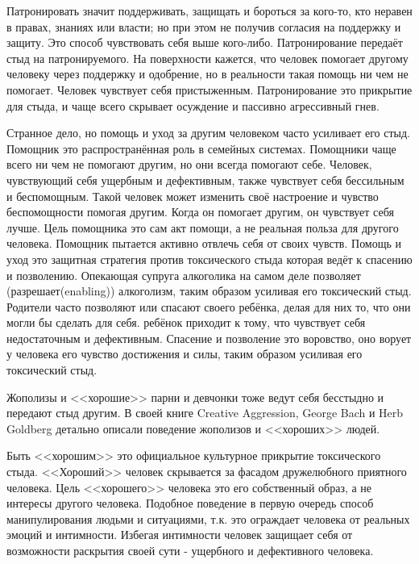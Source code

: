 \documentclass[10pt, fleqn]{article}
\begin{document}

Патронировать значит поддерживать, защищать и бороться за кого-то, кто неравен в правах, знаниях или власти; но при этом не получив согласия на поддержку и защиту. Это способ чувствовать себя выше кого-либо. Патронирование передаёт стыд на патронируемого. На поверхности кажется, что человек помогает другому человеку через поддержку и одобрение, но в реальности такая помощь ни чем не помогает. Человек чувствует себя пристыженным. Патронирование это прикрытие для стыда, и чаще всего скрывает осуждение и пассивно агрессивный гнев.



Странное дело, но помощь и уход за другим человеком часто усиливает его стыд. Помощник это распространённая роль в семейных системах. Помощники чаще всего ни чем не помогают другим, но они всегда помогают себе.
Человек, чувствующий себя ущербным и дефективным, также чувствует себя бессильным и беспомощным. Такой человек может изменить своё настроение и чувство беспомощности помогая другим. Когда он помогает другим, он чувствует себя лучше. Цель помощника это сам акт помощи, а не реальная польза для другого человека. Помощник пытается активно отвлечь себя от своих чувств.
Помощь и уход это защитная стратегия против токсического стыда которая ведёт к спасению и позволению. Опекающая супруга алкоголика на самом деле позволяет (разрешает(enabling)) алкоголизм, таким образом усиливая его токсический стыд. Родители часто позволяют или спасают своего ребёнка, делая для них то, что они могли бы сделать для себя. ребёнок приходит к тому, что чувствует себя недостаточным и дефективным. Спасение и позволение это воровство, оно ворует у человека его чувство достижения и силы, таким образом усиливая его токсический стыд.


Жополизы и <<хорошие>> парни и девчонки тоже ведут себя бесстыдно и передают стыд другим. В своей книге Creative Aggression, George Bach и Herb Goldberg детально описали поведение жополизов и <<хороших>> людей.

Быть <<хорошим>> это официальное культурное прикрытие токсического стыда. <<Хороший>> человек скрывается за фасадом дружелюбного приятного человека.
Цель <<хорошего>> человека это его собственный образ, а не интересы другого человека. Подобное поведение в первую очередь способ манипулирования людьми и ситуациями, т.к. это ограждает человека от реальных эмоций и интимности. Избегая интимности человек защищает себя от возможности раскрытия своей сути - ущербного и дефективного человека.
\end{document}
